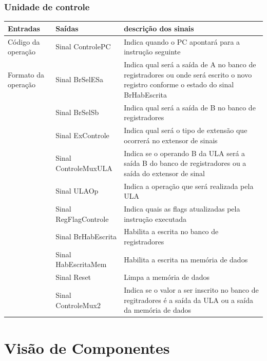 \documentclass{article}
\begin{document}
 \subsection{Unidade de controle}
  \FloatBarrier
    \begin{table}[H]
      \begin{center}
        \begin{tabular}[pos]{|m{4cm} | m{4cm}| m{5cm}|} 
          \hline
          \cellcolor[gray]{0.9}\textbf{Entradas} & \cellcolor[gray]{0.9}\textbf{Saídas} & 
          \cellcolor[gray]{0.9}\textbf{descrição dos sinais}\\ \hline
            Código da operação & Sinal ControlePC & Indica quando o PC apontará para a instrução seguinte \\ \hline
            Formato da operação & Sinal BrSelESa & Indica qual será a saída de A no banco de registradores ou onde será escrito o novo registro conforme o estado do sinal BrHabEscrita\\ \hline
            & Sinal BrSelSb & Indica qual será a saída de B no banco de registradores \\ \hline
            & Sinal ExControle & Indica qual será o tipo de extensão que ocorrerá no extensor de sinais\\ \hline
            & Sinal ControleMuxULA & Indica se o operando B da ULA será a saída B do banco de registradores ou a saída do extensor de sinal \\ \hline
            & Sinal ULAOp & Indica a operação que será realizada pela ULA\\ \hline
            & Sinal RegFlagControle & Indica quais as flags atualizadas pela instrução executada\\ \hline
            & Sinal BrHabEscrita & Habilita a escrita no banco de registradores \\ \hline
            & Sinal HabEscritaMem & Habilita a escrita na memória de dados\\ \hline
            & Sinal Reset & Limpa a memória de dados \\ \hline
            & Sinal ControleMux2 & Indica se o valor a ser inscrito no banco de regitradores é a saída da ULA ou a saída da memória de dados  \\ \hline
        \end{tabular}
      \end{center}
    \end{table}  


 
\chapter{Visão de Componentes}
\end{document}
